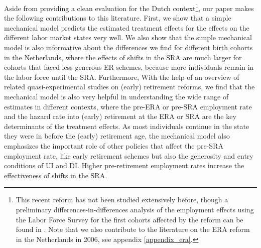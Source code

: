 \documentclass[12pt,a4paper]{article}
\begin{document}
Aside from providing a clean evaluation for the Dutch context\footnote{This recent reform has not been studied extensively before, though a preliminary differences-in-differences analysis of the employment effects using the Labor Force Survey for the first cohorts affected by the reform can be found in \cite{de_vos_social_2019}. Note that we also contribute to the literature on the ERA reform in the Netherlands in 2006, see appendix \ref{appendix_era}.}, our paper makes the following contributions to this literature.
First, we show that a simple mechanical model predicts the estimated treatment effects for the effects on the different labor market states very well. We also show that the simple mechanical model is also informative about the differences we find for different birth cohorts in the Netherlands, where the effects of shifts in the SRA are much larger for cohorts that faced less generous ER schemes, because more individuals remain in the labor force until the SRA. Furthermore, With the help of an overview of related quasi-experimental studies on (early) retirement reforms, we find that the mechanical model is also very helpful in understanding the wide range of estimates in different contexts, where the pre-ERA or pre-SRA employment rate and the hazard rate into (early) retirement at the ERA or SRA are the key determinants of the treatment effects. As most individuals continue in the state they were in before the (early) retirement age, the mechanical model also emphasizes the important role of other policies that affect the pre-SRA employment rate, like early retirement schemes but also the generosity and entry conditions of UI and DI. Higher pre-retirement employment rates increase the effectiveness of shifts in the SRA.

\end{document}
